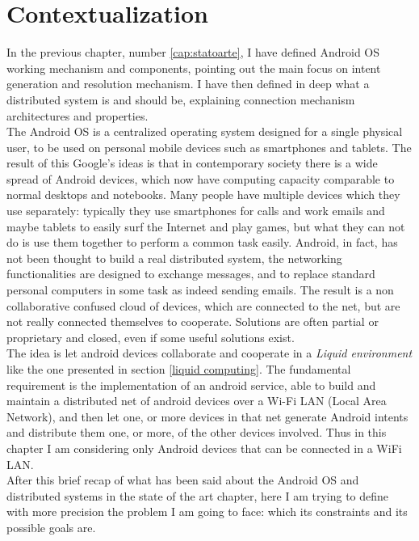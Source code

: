 \section{Contextualization} \label{facedProblem}
In the previous chapter, number \ref{cap:statoarte}, I have defined Android OS working mechanism and components, pointing out the main focus on intent generation and resolution mechanism. I have then defined in deep what a distributed system is and should be, explaining connection mechanism architectures and properties.\\ 
The Android OS is a centralized operating system designed for a single physical user, to be used on personal mobile devices such as smartphones and tablets. The result of this Google's ideas is that in contemporary society there is a wide spread of Android devices, which now have computing capacity comparable to normal desktops and notebooks. Many people have multiple devices which they use separately: typically they use smartphones for calls and  work emails and maybe tablets to easily surf the Internet and play games, but what they can not do is use them together to perform a common task easily. Android, in fact, has not been thought to build a real distributed system, the networking functionalities are designed to exchange messages, and to replace standard personal computers in some task as indeed sending emails.
The result is a non collaborative confused cloud of devices, which are connected to the net, but are not really connected themselves to cooperate. Solutions are often partial or proprietary and closed, even if some useful solutions exist.\\
The idea is let android devices collaborate and cooperate in a \textit{Liquid environment} like the one presented in section \ref{liquid computing}. The fundamental requirement is the implementation of an android service, able to build and maintain a distributed net of android devices over a Wi-Fi LAN (Local Area Network), and then let one, or more devices in that net generate Android intents and distribute them one, or more, of the other devices involved. Thus in this chapter I am considering only Android devices that can be connected in a WiFi LAN.\\
After this brief recap of what has been said about the Android OS and distributed systems in the state of the art chapter, here I am trying to define with more precision the problem I am going to face: which its constraints and its possible goals are.

